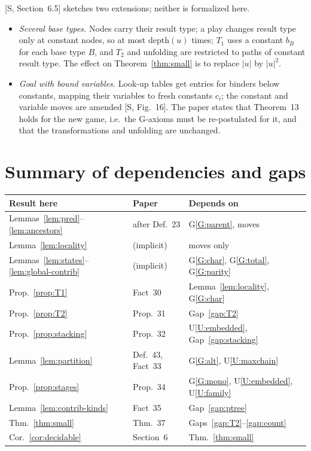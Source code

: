 \documentclass[11pt]{article}
\newcommand{\depth}{\mathrm{depth}}
\theoremstyle{plain}
\theoremstyle{definition}
\theoremstyle{remark}
\begin{document}
[S, Section~6.5] sketches two extensions; neither is formalized here.
\begin{itemize}
\item \emph{Several base types.} Nodes carry their result type; a play
  changes result type only at constant nodes, so at most $\depth(u)$
  times; $T_1$ uses a constant $b_B$ for each base type $B$, and $T_2$
  and unfolding are restricted to paths of constant result type.  The
  effect on Theorem~\ref{thm:small} is to replace $|u|$ by $|u|^2$.
\item \emph{Goal with bound variables.} Look-up tables get entries for
  binders below constants, mapping their variables to fresh constants
  $c_i$; the constant and variable moves are amended [S, Fig.~16].  The
  paper states that Theorem~13 holds for the new game, i.e.\ the
  G-axioms must be re-postulated for it, and that the transformations
  and unfolding are unchanged.
\end{itemize}

\section{Summary of dependencies and gaps}\label{sec:gaps}

\begin{center}
\begin{tabular}{lll}
Result here & Paper & Depends on\\\hline
Lemmas~\ref{lem:pred}--\ref{lem:ancestors} & after Def.~23 & G\ref{G:parent}, moves\\
Lemma~\ref{lem:locality} & (implicit) & moves only\\
Lemmas~\ref{lem:states}--\ref{lem:global-contrib} & (implicit) & G\ref{G:char}, G\ref{G:total}, G\ref{G:parity}\\
Prop.~\ref{prop:T1} & Fact~30 & Lemma~\ref{lem:locality}, G\ref{G:char}\\
Prop.~\ref{prop:T2} & Prop.~31 & Gap~\ref{gap:T2}\\
Prop.~\ref{prop:stacking} & Prop.~32 & U\ref{U:embedded}, Gap~\ref{gap:stacking}\\
Lemma~\ref{lem:partition} & Def.~43, Fact~33 & G\ref{G:alt}, U\ref{U:maxchain}\\
Prop.~\ref{prop:stages} & Prop.~34 & G\ref{G:mono}, U\ref{U:embedded}, U\ref{U:family}\\
Lemma~\ref{lem:contrib-kinds} & Fact~35 & Gap~\ref{gap:ptree}\\
Thm.~\ref{thm:small} & Thm.~37 & Gaps~\ref{gap:T2}--\ref{gap:count}\\
Cor.~\ref{cor:decidable} & Section~6 & Thm.~\ref{thm:small}
\end{tabular}
\end{center}
\end{document}
